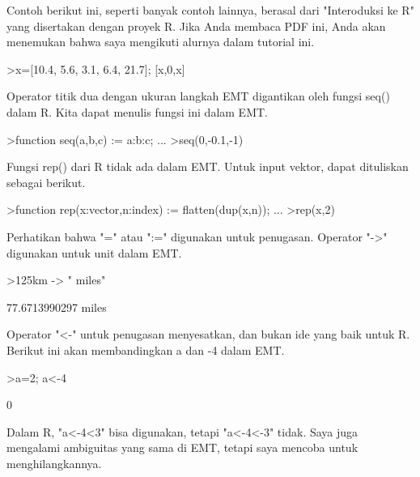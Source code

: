 \documentclass[a4paper,10pt]{article}
\begin{document}
\begin{eulernotebook}
\begin{eulercomment}
\begin{eulercomment}
\begin{eulercomment}
\begin{eulercomment}
\begin{eulercomment}
Contoh berikut ini, seperti banyak contoh lainnya, berasal dari
"Interoduksi ke R" yang disertakan dengan proyek R. Jika Anda membaca
PDF ini, Anda akan menemukan bahwa saya mengikuti alurnya dalam
tutorial ini.
\end{eulercomment}
\begin{eulerprompt}
>x=[10.4, 5.6, 3.1, 6.4, 21.7]; [x,0,x]
\end{eulerprompt}
\begin{euleroutput}
  [10.4,  5.6,  3.1,  6.4,  21.7,  0,  10.4,  5.6,  3.1,  6.4,  21.7]
\end{euleroutput}
\begin{eulercomment}
Operator titik dua dengan ukuran langkah EMT digantikan oleh fungsi
seq() dalam R. Kita dapat menulis fungsi ini dalam EMT.
\end{eulercomment}
\begin{eulerprompt}
>function seq(a,b,c) := a:b:c; ...
>seq(0,-0.1,-1)
\end{eulerprompt}
\begin{euleroutput}
  [0,  -0.1,  -0.2,  -0.3,  -0.4,  -0.5,  -0.6,  -0.7,  -0.8,  -0.9,  -1]
\end{euleroutput}
\begin{eulercomment}
Fungsi rep() dari R tidak ada dalam EMT. Untuk input vektor, dapat
dituliskan sebagai berikut.
\end{eulercomment}
\begin{eulerprompt}
>function rep(x:vector,n:index) := flatten(dup(x,n)); ...
>rep(x,2)
\end{eulerprompt}
\begin{euleroutput}
  [10.4,  5.6,  3.1,  6.4,  21.7,  10.4,  5.6,  3.1,  6.4,  21.7]
\end{euleroutput}
\begin{eulercomment}
Perhatikan bahwa "=" atau ":=" digunakan untuk penugasan. Operator
"-\textgreater{}" digunakan untuk unit dalam EMT.
\end{eulercomment}
\begin{eulerprompt}
>125km -> " miles"
\end{eulerprompt}
\begin{euleroutput}
  77.6713990297 miles
\end{euleroutput}
\begin{eulercomment}
Operator "\textless{}-" untuk penugasan menyesatkan, dan bukan ide yang baik
untuk R. Berikut ini akan membandingkan a dan -4 dalam EMT.
\end{eulercomment}
\begin{eulerprompt}
>a=2; a<-4
\end{eulerprompt}
\begin{euleroutput}
  0
\end{euleroutput}
\begin{eulercomment}
Dalam R, "a\textless{}-4\textless{}3" bisa digunakan, tetapi "a\textless{}-4\textless{}-3" tidak. Saya juga
mengalami ambiguitas yang sama di EMT, tetapi saya mencoba untuk
menghilangkannya.


\end{eulercomment}
\end{eulercomment}
\end{eulercomment}
\end{eulercomment}
\end{eulercomment}
\end{eulernotebook}
\end{document}
